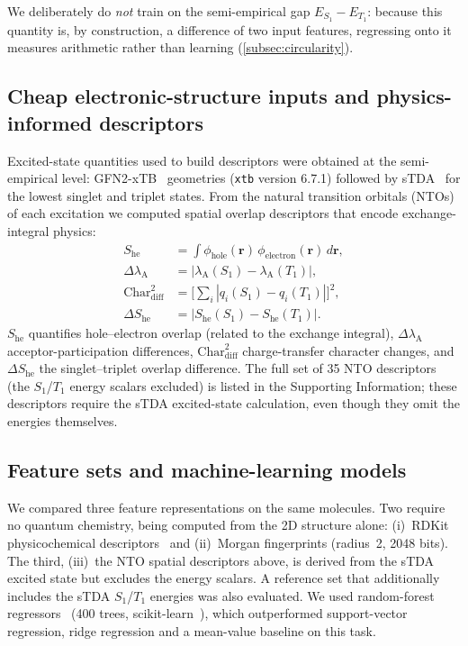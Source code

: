 We deliberately do \emph{not} train on the semi-empirical gap
$E_{S_1}-E_{T_1}$: because this quantity is, by construction, a difference of two
input features, regressing onto it measures arithmetic rather than learning
(\cref{subsec:circularity}).

\subsection{Cheap electronic-structure inputs and physics-informed descriptors}

Excited-state quantities used to build descriptors were obtained at the
semi-empirical level: GFN2-xTB~\cite{Bannwarth2019} geometries
(\texttt{xtb} version 6.7.1) followed by sTDA~\cite{Grimme2017} for the lowest singlet
and triplet states. From the natural transition orbitals
(NTOs)~\cite{Martin2003} of each excitation we computed spatial overlap
descriptors that encode exchange-integral physics:
\begin{align}
  S_\text{he} &= \int \phi_\text{hole}(\mathbf{r})\,\phi_\text{electron}(\mathbf{r})\,d\mathbf{r}, \label{eq:overlap}\\
  \Delta\lambda_\text{A} &= |\lambda_\text{A}(S_1) - \lambda_\text{A}(T_1)|, \label{eq:delta_lambda}\\
  \text{Char}_\text{diff}^2 &= \Big[\textstyle\sum_i |q_i(S_1) - q_i(T_1)|\Big]^2, \label{eq:char_diff}\\
  \Delta S_\text{he} &= |S_\text{he}(S_1) - S_\text{he}(T_1)|. \label{eq:delta_overlap}
\end{align}
$S_\text{he}$ quantifies hole--electron overlap (related to the exchange
integral), $\Delta\lambda_\text{A}$ acceptor-participation differences,
$\text{Char}_\text{diff}^2$ charge-transfer character changes, and
$\Delta S_\text{he}$ the singlet--triplet overlap difference. The full set of
\num{35} NTO descriptors (the $S_1$/$T_1$ energy scalars excluded) is listed in
the Supporting Information; these descriptors require the sTDA excited-state
calculation, even though they omit the energies themselves.

\subsection{Feature sets and machine-learning models}

We compared three feature representations on the same molecules. Two require no
quantum chemistry, being computed from the 2D structure alone:
(i)~RDKit physicochemical descriptors~\cite{Landrum2016} and (ii)~Morgan
fingerprints (radius~2, \num{2048} bits). The third, (iii)~the NTO spatial
descriptors above, is derived from the sTDA excited state but excludes the energy
scalars. A reference set that additionally includes the sTDA $S_1$/$T_1$
energies was also evaluated. We used random-forest
regressors~\cite{Breiman2001} (\num{400} trees, scikit-learn~\cite{Pedregosa2011}),
which outperformed support-vector regression, ridge regression and a mean-value
baseline on this task.

